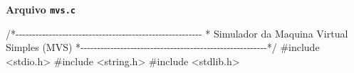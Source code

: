 \documentclass[
  brazilian,
  letterpaper,
]{book}
\newenvironment{Shaded}{\begin{snugshade}}{\end{snugshade}}
\newcommand{\CommentTok}[1]{\textcolor[rgb]{0.37,0.37,0.37}{#1}}
\newcommand{\ImportTok}[1]{\textcolor[rgb]{0.00,0.46,0.62}{#1}}
\newcommand{\PreprocessorTok}[1]{\textcolor[rgb]{0.68,0.00,0.00}{#1}}
\theoremstyle{plain}
\theoremstyle{definition}
\theoremstyle{remark}
\begin{document}
\textbf{Arquivo \texttt{mvs.c}}

\begin{Shaded}
\begin{Highlighting}[]
\CommentTok{/*{-}{-}{-}{-}{-}{-}{-}{-}{-}{-}{-}{-}{-}{-}{-}{-}{-}{-}{-}{-}{-}{-}{-}{-}{-}{-}{-}{-}{-}{-}{-}{-}{-}{-}{-}{-}{-}{-}{-}{-}{-}{-}{-}{-}{-}{-}{-}{-}{-}{-}{-}{-}{-}{-}{-}{-}}
\CommentTok{ *      Simulador da Maquina Virtual Simples (MVS)                            }
\CommentTok{ *{-}{-}{-}{-}{-}{-}{-}{-}{-}{-}{-}{-}{-}{-}{-}{-}{-}{-}{-}{-}{-}{-}{-}{-}{-}{-}{-}{-}{-}{-}{-}{-}{-}{-}{-}{-}{-}{-}{-}{-}{-}{-}{-}{-}{-}{-}{-}{-}{-}{-}{-}{-}{-}{-}{-}{-}*/}
\PreprocessorTok{\#include }\ImportTok{\textless{}stdio.h\textgreater{}}
\PreprocessorTok{\#include }\ImportTok{\textless{}string.h\textgreater{}}
\PreprocessorTok{\#include }\ImportTok{\textless{}stdlib.h\textgreater{}}


\end{Highlighting}
\end{Shaded}
\end{document}

